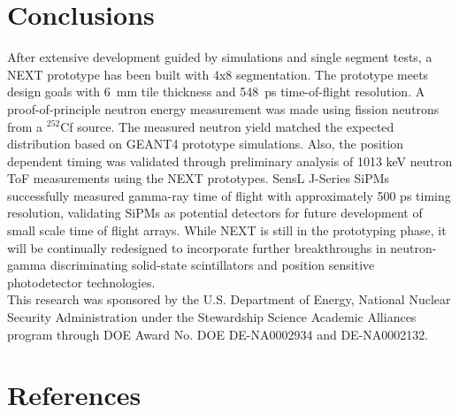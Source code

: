 \documentclass[preprint,3p,twocolumn]{elsarticle}
\begin{document}




\section{Conclusions}
After extensive development guided by simulations and single segment tests, a NEXT prototype has been built with 4x8 segmentation. The prototype meets design goals with 6~mm tile thickness and 548~ps time-of-flight resolution. A proof-of-principle neutron energy measurement was made using fission neutrons from a $^{252}$Cf source. The measured neutron yield matched the expected distribution based on GEANT4 prototype simulations. Also, the position dependent timing was validated through preliminary analysis of 1013 keV neutron ToF measurements using the NEXT prototypes.
SensL\textsuperscript{\texttrademark} J-Series SiPMs successfully measured gamma-ray time of flight with approximately 500 ps timing resolution, validating SiPMs as potential detectors for future development of small scale time of flight arrays.
While NEXT is still in the prototyping phase, it will be continually redesigned to incorporate further breakthroughs in neutron-gamma discriminating solid-state scintillators and position sensitive photodetector technologies.\\
This research was sponsored by the U.S. Department of Energy, National Nuclear Security Administration under the Stewardship Science Academic Alliances program through DOE Award No. DOE DE-NA0002934 and DE-NA0002132.

\section*{References}
%

\end{document}
